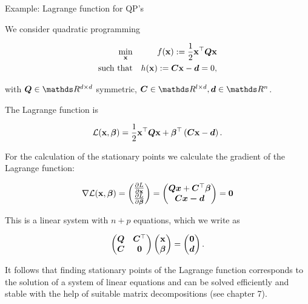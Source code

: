 \begin{vbframe}{Example: Lagrange function for QP's}


We consider quadratic programming

\begin{eqnarray*}
\min_{\mathbf{x}} && f(\mathbf{x}) := \frac{1}{2} \mathbf{x}^\top \bm{Q} \mathbf{x} \\
\text{such that} && h(\mathbf{x}) := \bm{C} \mathbf{x} - \bm{d} = 0,
\end{eqnarray*}

with $\bm{Q} \in \R^{d\times d}$ symmetric, $\bm{C} \in \R^{l \times d}, \bm{d} \in \R^n$.

\lz

The Lagrange function is

$$
\mathcal{L}(\mathbf{x}, \bm{\beta}) = \frac{1}{2} \mathbf{x}^\top \bm{Q} \mathbf{x} + \bm{\beta}^\top \left(\bm{C} \mathbf{x} - \bm{d}\right).
$$

\framebreak

For the calculation of the stationary points we calculate the gradient of the Lagrange function:

$$
\nabla \mathcal{L}(\mathbf{x}, \bm{\beta}) = \begin{pmatrix} \frac{\partial{L}}{\partial{\mathbf{x}}}  \\ \frac{\partial{L}}{\partial{\bm{\beta}}} \end{pmatrix} = \begin{pmatrix} \bm{Qx} + \bm{C}^\top\bm{\beta} \\ \bm{Cx - \bm{d}} \end{pmatrix} = \bm{0}
$$

This is a linear system with $n + p$ equations, which we write as

$$
\begin{pmatrix} \bm{Q} & \bm{C}^\top \\ \bm{C} & \bm{0} \end{pmatrix} \begin{pmatrix} \mathbf{x} \\ \bm{\beta} \end{pmatrix} = \begin{pmatrix} \bm{0} \\ \bm{d}  \end{pmatrix}.
$$

It follows that finding stationary points of the Lagrange function corresponds to the solution of a system of linear equations and can be solved efficiently and stable with the help of suitable matrix decompositions (see chapter 7).
\end{vbframe}

